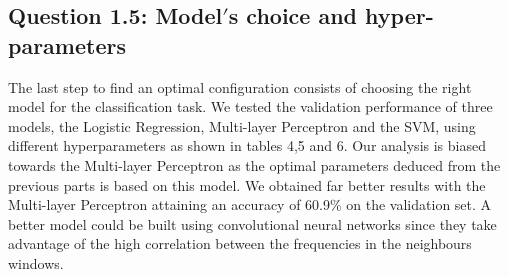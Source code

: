 \documentclass[9pt,twocolumn,letterpaper]{article}
\begin{document}
\subsection{Question 1.5: Model$'$s choice and hyper-parameters }
The last step to find an optimal configuration consists of choosing the right model for the classification task. We tested the validation performance of three models, the Logistic Regression, Multi-layer Perceptron and the SVM, using different hyperparameters as shown in tables 4,5 and 6. Our analysis is biased towards the Multi-layer Perceptron as the optimal parameters deduced from the previous parts is based on this model. We obtained far better results with the Multi-layer Perceptron attaining an accuracy of 60.9\% on the validation set. A better model could be built using convolutional neural networks since they take advantage of the high correlation between the frequencies in the neighbours windows.
\end{document}

